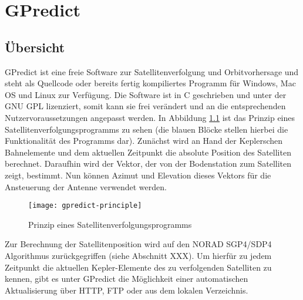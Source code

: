 
\chapter{GPredict}

\section{Übersicht}

GPredict ist eine freie Software zur Satellitenverfolgung und Orbitvorhersage und steht als Quellcode oder bereits fertig kompiliertes Programm für Windows, Mac OS und Linux zur Verfügung. Die Software ist in C geschrieben und unter der GNU \ac{GPL} lizenziert, somit kann sie frei verändert und an die entsprechenden Nutzervoraussetzungen angepasst werden.\newpar
In Abbildung \ref{fig:gpredict-principle} ist das Prinzip eines Satellitenverfolgungsprogramms zu sehen (die blauen Blöcke stellen hierbei die Funktionalität des Programms dar). Zunächst wird an Hand der Keplerschen Bahnelemente und dem aktuellen Zeitpunkt die absolute Position des Satelliten berechnet. Daraufhin wird der Vektor, der von der Bodenstation zum Satelliten zeigt, bestimmt. Nun können Azimut und Elevation dieses Vektors für die Ansteuerung der Antenne verwendet werden.

\begin{figure}[h]
	\centering
	\texttt{[image: gpredict-principle]}
	\caption{Prinzip eines Satellitenverfolgungsprogramms \cite{gpredictmanual}}
	\label{fig:gpredict-principle} 
\end{figure}

Zur Berechnung der Satellitenposition wird auf den NORAD SGP4/SDP4 Algorithmus zurückgegriffen (siehe Abschnitt XXX). Um hierfür zu jedem Zeitpunkt die aktuellen Kepler-Elemente des zu verfolgenden Satelliten zu kennen, gibt es unter GPredict die Möglichkeit einer automatischen Aktualisierung über HTTP, FTP oder aus dem lokalen Verzeichnis.

